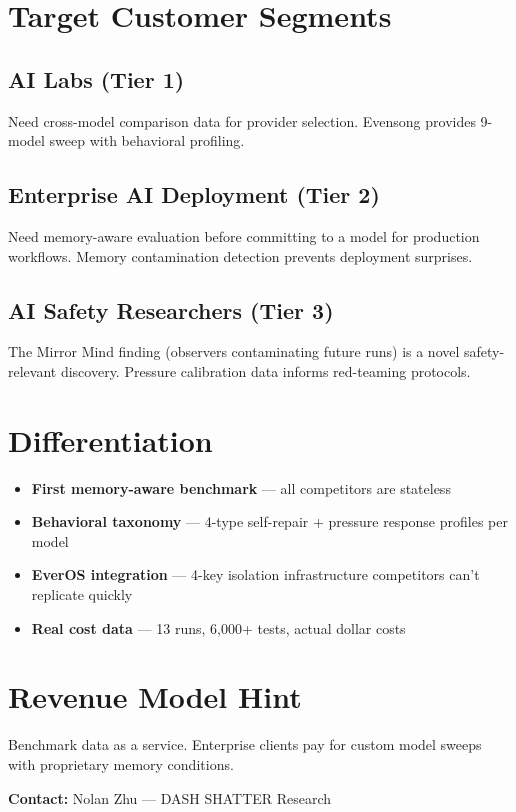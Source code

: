 \documentclass[11pt,a4paper]{article}
\begin{document}
\section{Target Customer Segments}

\subsection*{AI Labs (Tier 1)}
Need cross-model comparison data for provider selection. Evensong provides 9-model sweep with behavioral profiling.

\subsection*{Enterprise AI Deployment (Tier 2)}
Need memory-aware evaluation before committing to a model for production workflows. Memory contamination detection prevents deployment surprises.

\subsection*{AI Safety Researchers (Tier 3)}
The Mirror Mind finding (observers contaminating future runs) is a novel safety-relevant discovery. Pressure calibration data informs red-teaming protocols.

\section{Differentiation}

\begin{itemize}
  \item \textbf{First memory-aware benchmark} — all competitors are stateless
  \item \textbf{Behavioral taxonomy} — 4-type self-repair + pressure response profiles per model
  \item \textbf{EverOS integration} — 4-key isolation infrastructure competitors can't replicate quickly
  \item \textbf{Real cost data} — 13 runs, 6,000+ tests, actual dollar costs
\end{itemize}

\section{Revenue Model Hint}

Benchmark data as a service. Enterprise clients pay for custom model sweeps with proprietary memory conditions.

\vfill
\textbf{Contact:} Nolan Zhu — DASH SHATTER Research
\end{document}

